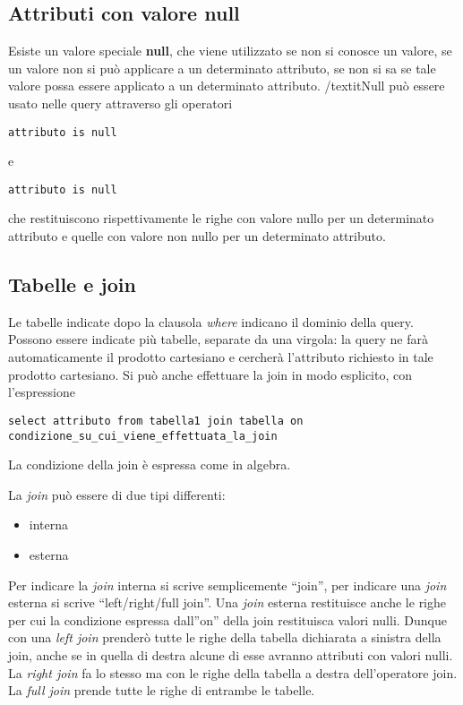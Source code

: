 \documentclass[\main/main.tex]{subfiles}
\begin{document}
\subsection{Attributi con valore null}
Esiste un valore speciale \textbf{null}, che viene utilizzato se non si conosce un valore, se un valore non si può applicare a un determinato attributo, se non si sa se tale valore possa essere applicato a un determinato attributo.
/textit{Null} può essere usato nelle query attraverso gli operatori
\begin{verbatim}
attributo is null
\end{verbatim}
e
\begin{verbatim}
attributo is null
\end{verbatim}
che restituiscono rispettivamente le righe con valore nullo per un determinato attributo e quelle con valore non nullo per un determinato attributo.

\subsection{Tabelle e join}
Le tabelle indicate dopo la clausola \textit{where} indicano il dominio della query.
Possono essere indicate più tabelle, separate da una virgola: la query ne farà automaticamente il prodotto cartesiano e cercherà l'attributo richiesto in tale prodotto cartesiano.
Si può anche effettuare la join in modo esplicito, con l'espressione

\begin{verbatim}
select attributo from tabella1 join tabella on condizione_su_cui_viene_effettuata_la_join
\end{verbatim}
La condizione della join è espressa come in algebra.

La \textit{join} può essere di due tipi differenti:
\begin{itemize}
  \item interna
  \item esterna
\end{itemize}
Per indicare la \textit{join} interna si scrive semplicemente ``join'', per indicare una \textit{join} esterna si scrive ``left/right/full join''.
Una \textit{join} esterna restituisce anche le righe per cui la condizione espressa dall''on'' della join restituisca valori nulli.
Dunque con una \textit{left join} prenderò tutte le righe della tabella dichiarata a sinistra della join, anche se in quella di destra alcune di esse avranno attributi con valori nulli.
La \textit{right join} fa lo stesso ma con le righe della tabella a destra dell'operatore join.
La \textit{full join} prende tutte le righe di entrambe le tabelle.
\end{document}
